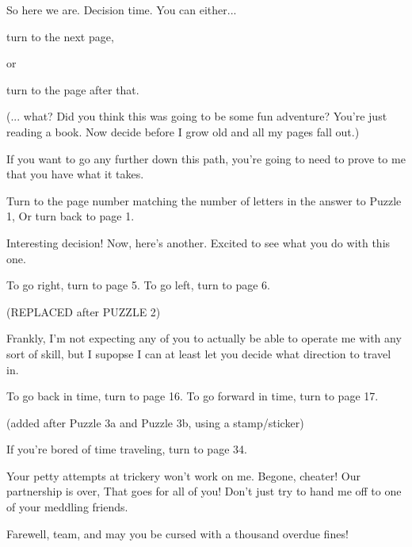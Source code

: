 \documentclass[14pt]{extbook}
\begin{document}


\pagestyle{fancy}

\vspace*{\fill} %
So here we are. Decision time. You can either...

\begin{center}
turn to the next page,

or

turn to the page after that.
\end{center}

(... what? Did you think this was going to be some fun adventure? You're just reading a book. Now decide before I grow old and all my pages fall out.)
\vspace*{\fill}
\newpage

\vspace*{\fill} %
If you want to go any further down this path, you're going to need to prove to me that you have what it takes.

Turn to the page number matching the number of letters in the answer to Puzzle 1,
Or turn back to page 1.
\vspace*{\fill}
\newpage

\vspace*{\fill} %
Interesting decision! Now, here's another. Excited to see what you do with this one.

To go right, turn to page 5.
To go left, turn to page 6.

(REPLACED after PUZZLE 2)

Frankly, I'm not expecting any of you to actually be able to operate me with any sort of skill, but I supopse I can at least let you decide what direction to travel in.

To go back in time, turn to page 16.
To go forward in time, turn to page 17.

(added after Puzzle 3a and Puzzle 3b, using a stamp/sticker)

If you're bored of time traveling, turn to page 34.
\vspace*{\fill}
\newpage

\vspace*{\fill} %
Your petty attempts at trickery won't work on me. Begone, cheater! Our partnership is over, That goes for all of you! Don't just try to hand me off to one of your meddling friends.

Farewell, team, and may you be cursed with a thousand overdue fines!
\end{document}
